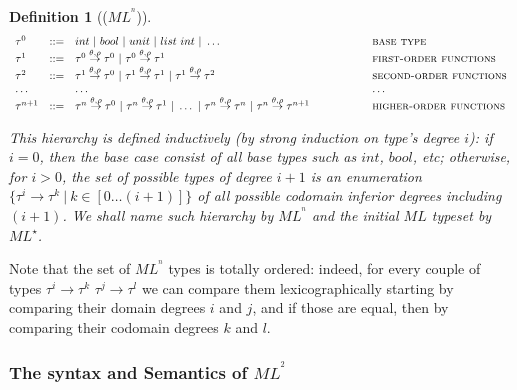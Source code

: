 \documentclass[a4paper,11pt,oneside]{article}
\theoremstyle{plain}
\newtheorem{definition}{Definition}[subsection]
\begin{document}
\begin{definition}[($ML^{^{n}}$)]
\begin{displaymath}
	\begin{array}{lll@{\hspace*{2cm}}l}
	\tau^0 & ::= & int~|~bool~|~unit~|~list~int~|~\dots~ & \textsc{base
          type} \\ \tau^1 & ::= & \tau^0 \stackrel{\theta, \rho}{\rightarrow}
        \tau^0 ~|~ \tau^0 \stackrel{\theta, \rho}{\rightarrow} \tau^1 &
        \textsc{first-order functions}\\ \tau^2 & ::= & \tau^1 \stackrel{\theta,
          \rho}{\rightarrow} \tau^0 ~|~ \tau^1 \stackrel{\theta,
          \rho}{\rightarrow} \tau^1 ~|~ \tau^1 \stackrel{\theta,
          \rho}{\rightarrow} \tau^2
	& \textsc{second-order functions} \\ \dots & & \dots & \dots
        \\ \tau^{n+1} & ::= & \tau^{n} \stackrel{\theta, \rho}{\rightarrow}
        \tau^0 ~|~ \tau^{n} \stackrel{\theta, \rho}{\rightarrow} \tau^1 ~|~
        \dots ~|~ \tau^{n} \stackrel{\theta, \rho}{\rightarrow} \tau^{n} ~|~
        \tau^{n} \stackrel{\theta, \rho}{\rightarrow}\tau^{n+1}
	& \textsc{higher-order functions} \\
	
	\end{array}
\end{displaymath}
\label{MLn-ty-d}

This hierarchy is defined inductively (by strong induction on type's degree
$i$): if $i=0$, then the base case consist of all base types such as $int$,
$bool$, etc; otherwise, for $i > 0$, the set of possible types of degree $i+1$
is an enumeration $\{\tau^{i} \rightarrow \tau^{k} ~|~ k \in [ 0 \dots (i+1) ]
\}$ of all possible codomain inferior degrees including $(i+1)$.
We shall name such hierarchy by $ML^{^{n}}$ and the initial $ML$ typeset by
$ML^\star$.
\end{definition}

Note that the set of $ML^{^{n}}$ types is totally ordered: indeed, for every
couple of types $\tau^i \rightarrow \tau^k$ $\tau^j \rightarrow \tau^l$ we can
compare them lexicographically starting by comparing their domain degrees $i$
and $j$, and if those are equal, then by comparing their codomain degrees $k$
and $l$.

\subsubsection{The syntax and Semantics of \texorpdfstring{$ML^{^{2}}$}{}}
\end{document}

